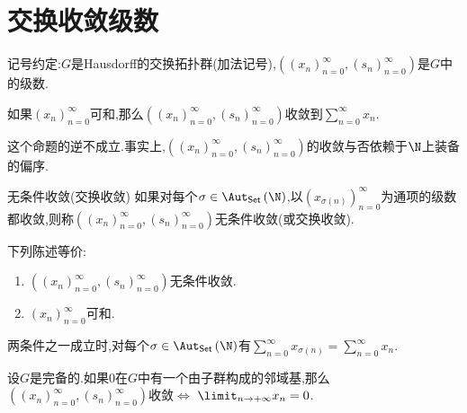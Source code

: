 \section{交换收敛级数}

记号约定:$G$是Hausdorff的交换拓扑群(加法记号),$\left(\left(x_{n}\right)_{n=0}^{\infty},\left(s_{n}\right)_{n=0}^{\infty}\right)$是$G$中的级数.

\begin{proposition}{}{}
	如果$\left(x_{n}\right)_{n=0}^{\infty}$可和,那么$\left(\left(x_{n}\right)_{n=0}^{\infty},\left(s_{n}\right)_{n=0}^{\infty}\right)$收敛到$\sum\limits_{n=0}^{\infty}x_{n}$.
\end{proposition}

\begin{remark}{}{}
	这个命题的逆不成立.事实上,$\left(\left(x_{n}\right)_{n=0}^{\infty},\left(s_{n}\right)_{n=0}^{\infty}\right)$的收敛与否依赖于$\N$上装备的偏序.
\end{remark}

\begin{definition}{无条件收敛(交换收敛)}{}
	如果对每个$\sigma\in\Aut_{\mathsf{Set}}\left(\N\right)$,以$\left(x_{\sigma\left(n\right)}\right)_{n=0}^{\infty}$为通项的级数都收敛,则称$\left(\left(x_{n}\right)_{n=0}^{\infty},\left(s_{n}\right)_{n=0}^{\infty}\right)$无条件收敛(或交换收敛).
\end{definition}

\begin{proposition}{}{}
	下列陈述等价:
	\begin{enumerate}
		\item $\left(\left(x_{n}\right)_{n=0}^{\infty},\left(s_{n}\right)_{n=0}^{\infty}\right)$无条件收敛.
		\item $\left(x_{n}\right)_{n=0}^{\infty}$可和.
	\end{enumerate}
	两条件之一成立时,对每个$\sigma\in\Aut_{\mathsf{Set}}\left(\N\right)$有$\sum\limits_{n=0}^{\infty}x_{\sigma\left(n\right)}=\sum\limits_{n=0}^{\infty}x_{n}$.
\end{proposition}

\begin{remark}{}{}
	设$G$是完备的.如果$0$在$G$中有一个由子群构成的邻域基,那么$\left(\left(x_{n}\right)_{n=0}^{\infty},\left(s_{n}\right)_{n=0}^{\infty}\right)$收敛$\iff$ $\limit_{n\to+\infty}x_{n}=0$.
\end{remark}